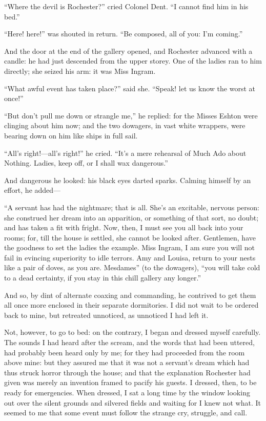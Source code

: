 \enquote{Where the devil is Rochester?} cried Colonel Dent. \enquote{I
	cannot find him in his bed.}

\enquote{Here! here!} was shouted in return. \enquote{Be composed, all
	of you: I'm coming.}

And the door at the end of the gallery opened, and \Mr{} Rochester
advanced with a candle: he had just descended from the upper storey.
One of the ladies ran to him directly; she seized his arm: it was Miss
Ingram.

\enquote{What awful event has taken place?} said she. \enquote{Speak!
	let us know the worst at once!}

\enquote{But don't pull me down or strangle me,} he replied: for the
Misses Eshton were clinging about him now; and the two dowagers, in vast
white wrappers, were bearing down on him like ships in full sail.

\enquote{All's right!---all's right!} he cried. \enquote{It's a mere
	rehearsal of Much Ado about Nothing. Ladies, keep off, or I shall wax
	dangerous.}

And dangerous he looked: his black eyes darted sparks. Calming himself
by an effort, he added---

\enquote{A servant has had the nightmare; that is all. She's an
	excitable, nervous person: she construed her dream into an apparition,
	or something of that sort, no doubt; and has taken a fit with fright.
	Now, then, I must see you all back into your rooms; for, till the house
	is settled, she cannot be looked after. Gentlemen, have the goodness to
	set the ladies the example. Miss Ingram, I am sure you will not fail in
	evincing superiority to idle terrors. Amy and Louisa, return to your
	nests like a pair of doves, as you are.  Mesdames} (to the dowagers),
\enquote{you will take cold to a dead certainty, if you stay in this
	chill gallery any longer.}

And so, by dint of alternate coaxing and commanding, he contrived to get
them all once more enclosed in their separate dormitories. I did not
wait to be ordered back to mine, but retreated unnoticed, as unnoticed I
had left it.

Not, however, to go to bed: on the contrary, I began and dressed myself
carefully. The sounds I had heard after the scream, and the words that
had been uttered, had probably been heard only by me; for they had
proceeded from the room above mine: but they assured me that it was not
a servant's dream which had thus struck horror through the house; and
that the explanation \Mr{} Rochester had given was merely an invention
framed to pacify his guests. I dressed, then, to be ready for
emergencies. When dressed, I sat a long time by the window looking out
over the silent grounds and silvered fields and waiting for I knew not
what. It seemed to me that some event must follow the strange cry,
struggle, and call.

